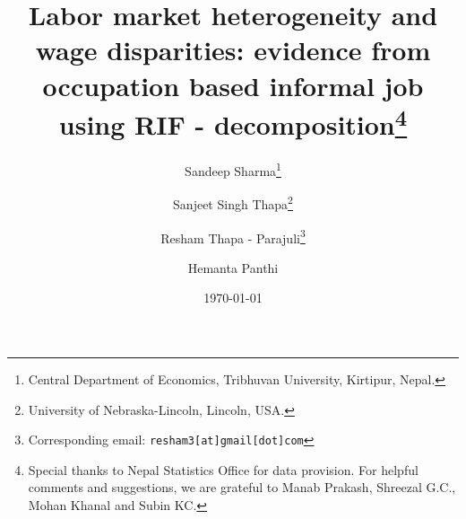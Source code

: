 \begin{titlepage}
\title{\vspace{-2.0cm}Labor market heterogeneity and wage disparities: evidence from occupation based informal job using RIF - decomposition\footnote {Special thanks to Nepal Statistics Office for data provision. For helpful comments and suggestions, we are grateful to Manab Prakash, Shreezal G.C., Mohan Khanal and Subin KC.}
}
\author{Sandeep Sharma\thanks{Central Department of Economics, Tribhuvan University, Kirtipur, Nepal.} \and
	Sanjeet Singh Thapa\thanks{University of Nebraska-Lincoln, Lincoln, USA.} \and
	Resham Thapa - Parajuli\thanks{Corresponding email: \texttt{resham3[at]gmail[dot]com}} \and
	Hemanta Panthi\footnotemark[2]}

\date{\today}
\maketitle

\thispagestyle{empty}
\end{titlepage}
\pagebreak 
